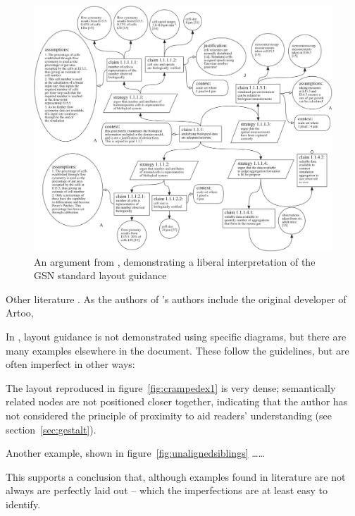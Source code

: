 \begin{figure}
    \includegraphics[width=\textwidth]{graphics/aldencentral.jpg}
    \caption{An argument from \cite{royal}, demonstrating a liberal interpretation of the GSN standard layout guidance}
    \label{fig:aldencentral}
\end{figure}

Other literature  . As the authors of \cite{royal}'s authors include the original developer of Artoo, 

In \cite{gsnstandard}, layout guidance is not demonstrated using specific diagrams, but there are many examples elsewhere in the document. These follow the guidelines, but are often imperfect in other ways:

\begin{itemize*}
    \item The layout reproduced in figure~\ref{fig:crampedex1} is very dense; semantically related nodes are not positioned closer together, indicating that the author has not considered the principle of proximity to aid readers' understanding (see section~\ref{sec:gestalt}).
    \item Another example, shown in figure~\ref{fig:unalignedsiblings} \ldots \ldots
\end{itemize*}

This supports a conclusion that, although examples found in literature are not always are perfectly laid out -- which  the imperfections are at least easy to identify.

